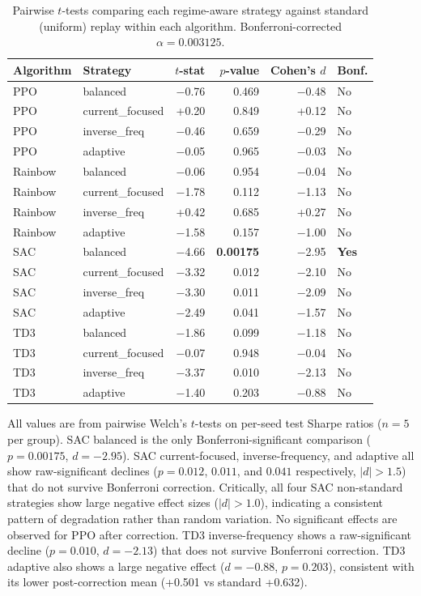 \documentclass[11pt,a4paper]{article}
\begin{document}
\begin{table}[H]
\centering
\small
\caption{Pairwise $t$-tests comparing each regime-aware strategy against standard (uniform) replay within each algorithm. Bonferroni-corrected $\alpha = 0.003125$.}
\label{tab:e1-ttests}
\begin{tabular}{@{}llrrrl@{}}
\toprule
\textbf{Algorithm} & \textbf{Strategy} & \textbf{$t$-stat} & \textbf{$p$-value} & \textbf{Cohen's $d$} & \textbf{Bonf.} \\
\midrule
PPO & balanced & $-$0.76 & 0.469 & $-$0.48 & No \\
PPO & current\_focused & +0.20 & 0.849 & +0.12 & No \\
PPO & inverse\_freq & $-$0.46 & 0.659 & $-$0.29 & No \\
PPO & adaptive & $-$0.05 & 0.965 & $-$0.03 & No \\
\midrule
Rainbow & balanced & $-$0.06 & 0.954 & $-$0.04 & No \\
Rainbow & current\_focused & $-$1.78 & 0.112 & $-$1.13 & No \\
Rainbow & inverse\_freq & +0.42 & 0.685 & +0.27 & No \\
Rainbow & adaptive & $-$1.58 & 0.157 & $-$1.00 & No \\
\midrule
SAC & balanced & $-$4.66 & \textbf{0.00175} & $-$2.95 & \textbf{Yes} \\
SAC & current\_focused & $-$3.32 & 0.012 & $-$2.10 & No \\
SAC & inverse\_freq & $-$3.30 & 0.011 & $-$2.09 & No \\
SAC & adaptive & $-$2.49 & 0.041 & $-$1.57 & No \\
\midrule
TD3 & balanced & $-$1.86 & 0.099 & $-$1.18 & No \\
TD3 & current\_focused & $-$0.07 & 0.948 & $-$0.04 & No \\
TD3 & inverse\_freq & $-$3.37 & 0.010 & $-$2.13 & No \\
TD3 & adaptive & $-$1.40 & 0.203 & $-$0.88 & No \\
\bottomrule
\end{tabular}
\end{table}

All values are from pairwise Welch's $t$-tests on per-seed test Sharpe ratios ($n = 5$ per group). SAC balanced is the only Bonferroni-significant comparison ($p = 0.00175$, $d = -2.95$). SAC current-focused, inverse-frequency, and adaptive all show raw-significant declines ($p = 0.012$, $0.011$, and $0.041$ respectively, $|d| > 1.5$) that do not survive Bonferroni correction. Critically, all four SAC non-standard strategies show large negative effect sizes ($|d| > 1.0$), indicating a consistent pattern of degradation rather than random variation. No significant effects are observed for PPO after correction. TD3 inverse-frequency shows a raw-significant decline ($p = 0.010$, $d = -2.13$) that does not survive Bonferroni correction. TD3 adaptive also shows a large negative effect ($d = -0.88$, $p = 0.203$), consistent with its lower post-correction mean (+0.501 vs standard +0.632).
\end{document}
